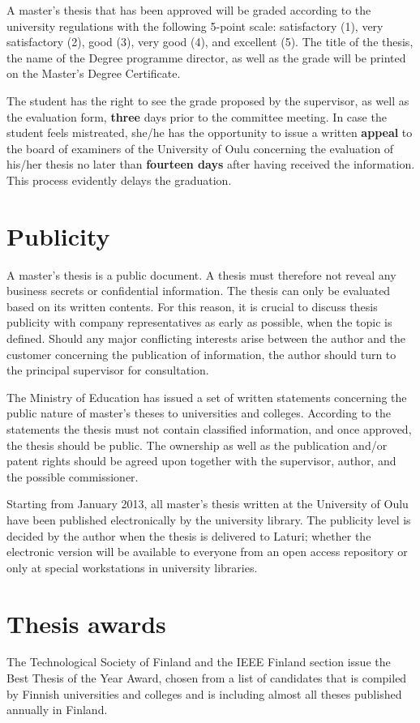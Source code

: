 A master’s thesis that has been approved will be graded according to the university regulations with the following 5-point scale: satisfactory (1), very satisfactory (2), good (3), very good (4), and excellent (5). The title of the thesis, the name of the Degree programme director, as well as the grade will be printed on the Master’s Degree Certificate.

The student has the right to see the grade proposed by the supervisor, as well as the evaluation form, \textbf{three} days prior to the committee meeting. In case the student feels mistreated, she/he has the opportunity to issue a written \textbf{appeal} to the board of examiners of the University of Oulu concerning the evaluation of his/her thesis no later than \textbf{fourteen days} after having received the information. This process evidently delays the graduation.

\section{Publicity}
\label{sec:publicity}

A master’s thesis is a public document. A thesis must therefore not reveal any business secrets or confidential information. The thesis can only be evaluated based on its written contents. For this reason, it is crucial to discuss thesis publicity with company representatives as early as possible, when the topic is defined. Should any major conflicting interests arise between the author and the customer concerning the publication of information, the author should turn to the principal supervisor for consultation.

The Ministry of Education has issued a set of written statements concerning the public nature of master’s theses to universities and colleges. According to the statements the thesis must not contain classified information, and once approved, the thesis should be public. The ownership as well as the publication and/or patent rights should be agreed upon together with the supervisor, author, and the possible commissioner.

Starting from January 2013, all master’s thesis written at the University of Oulu have been published electronically by the university library. The publicity level is decided by the author when the thesis is delivered to Laturi; whether the electronic version will be available to everyone from an open access repository or only at special workstations in university libraries.

\section{Thesis awards}

The Technological Society of Finland and the IEEE Finland section issue the Best Thesis of the Year Award, chosen from a list of candidates that is compiled by Finnish universities and colleges and is including almost all theses published annually in Finland.